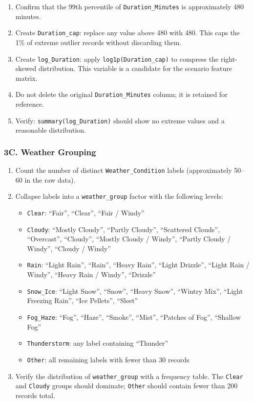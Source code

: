 \documentclass[11pt]{article}
\begin{document}
\begin{enumerate}
  \item Confirm that the 99th percentile of \texttt{Duration\_Minutes} is approximately 480 minutes.
  \item Create \texttt{Duration\_cap}: replace any value above 480 with 480. This caps the 1\% of extreme outlier records without discarding them.
  \item Create \texttt{log\_Duration}: apply \texttt{log1p(Duration\_cap)} to compress the right-skewed distribution. This variable is a candidate for the scenario feature matrix.
  \item Do not delete the original \texttt{Duration\_Minutes} column; it is retained for reference.
  \item Verify: \texttt{summary(log\_Duration)} should show no extreme values and a reasonable distribution.
\end{enumerate}

\subsubsection*{3C. Weather Grouping}

\begin{enumerate}
  \item Count the number of distinct \texttt{Weather\_Condition} labels (approximately 50--60 in the raw data).
  \item Collapse labels into a \texttt{weather\_group} factor with the following levels:
  \begin{itemize}
    \item \texttt{Clear}: ``Fair'', ``Clear'', ``Fair / Windy''
    \item \texttt{Cloudy}: ``Mostly Cloudy'', ``Partly Cloudy'', ``Scattered Clouds'', ``Overcast'', ``Cloudy'', ``Mostly Cloudy / Windy'', ``Partly Cloudy / Windy'', ``Cloudy / Windy''
    \item \texttt{Rain}: ``Light Rain'', ``Rain'', ``Heavy Rain'', ``Light Drizzle'', ``Light Rain / Windy'', ``Heavy Rain / Windy'', ``Drizzle''
    \item \texttt{Snow\_Ice}: ``Light Snow'', ``Snow'', ``Heavy Snow'', ``Wintry Mix'', ``Light Freezing Rain'', ``Ice Pellets'', ``Sleet''
    \item \texttt{Fog\_Haze}: ``Fog'', ``Haze'', ``Smoke'', ``Mist'', ``Patches of Fog'', ``Shallow Fog''
    \item \texttt{Thunderstorm}: any label containing ``Thunder''
    \item \texttt{Other}: all remaining labels with fewer than 30 records
  \end{itemize}
  \item Verify the distribution of \texttt{weather\_group} with a frequency table. The \texttt{Clear} and \texttt{Cloudy} groups should dominate; \texttt{Other} should contain fewer than 200 records total.
\end{enumerate}
\end{document}
